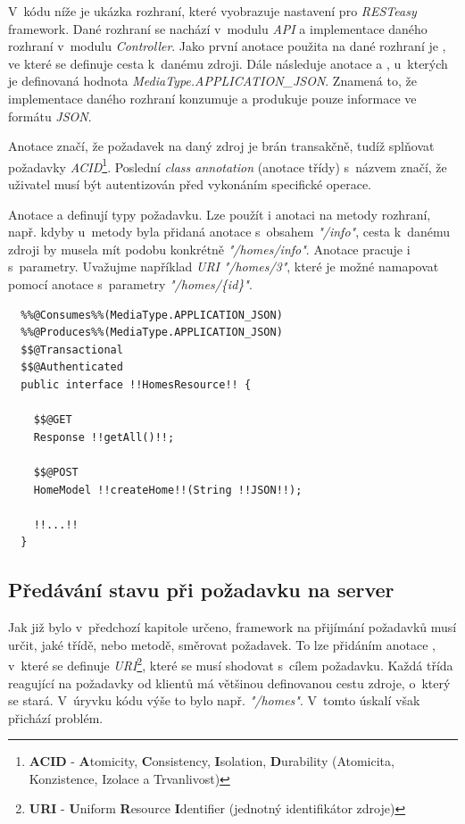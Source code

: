 V~kódu níže je ukázka rozhraní, které vyobrazuje nastavení pro \emph{RESTeasy} framework.
Dané rozhraní se nachází v~modulu \emph{API} a implementace daného rozhraní v~modulu \emph{Controller}.
Jako první anotace použita na dané rozhraní je , ve které se definuje cesta k~danému zdroji.
Dále následuje anotace  a , u~kterých je definovaná hodnota \emph{MediaType.APPLICATION\_JSON}.
Znamená to, že implementace daného rozhraní konzumuje a produkuje pouze informace ve formátu \emph{JSON}.

Anotace  značí, že požadavek na daný zdroj je brán transakčně, tudíž splňovat požadavky \emph{ACID}\footnote{\textbf{ACID} - \textbf{A}tomicity, \textbf{C}onsistency, \textbf{I}solation, \textbf{D}urability (Atomicita, Konzistence, Izolace a Trvanlivost)}.
Poslední \emph{class annotation} (anotace třídy) s~názvem  značí, že uživatel musí být autentizován před vykonáním specifické operace.

Anotace  a  definují typy požadavku.
Lze použít i anotaci  na metody rozhraní, např. kdyby u~metody byla přidaná anotace  s~obsahem \emph{"/info"}, cesta k~danému zdroji
by musela mít podobu konkrétně \emph{"/homes/info"}.
Anotace  pracuje i s~parametry.
Uvažujme například \emph{URI} \emph{"/homes/3"}, které je možné namapovat pomocí anotace  s~parametry \emph{"/homes/\{id\}"}.

\begin{lstlisting}[style=JavaStyle, caption={Ukázka deklarování rozhraní pro správu domácností}]
  %%@Path%%("/homes")
  %%@Consumes%%(MediaType.APPLICATION_JSON)
  %%@Produces%%(MediaType.APPLICATION_JSON)
  $$@Transactional
  $$@Authenticated
  public interface !!HomesResource!! {

    $$@GET
    Response !!getAll()!!;

    $$@POST
    HomeModel !!createHome!!(String !!JSON!!);

    !!...!!
  }
\end{lstlisting}

\newpage
\subsection*{Předávání stavu při požadavku na server}
\label{impl:backend:state}

Jak již bylo v~předchozí kapitole určeno, framework na přijímání požadavků musí určit, jaké třídě, nebo metodě, směrovat požadavek.
To lze přidáním anotace , v~které se definuje \emph{URI}\footnote{\textbf{URI} - \textbf{U}niform \textbf{R}esource \textbf{I}dentifier (jednotný identifikátor zdroje)}, které se musí shodovat s~cílem požadavku.
Každá třída reagující na požadavky od klientů má většinou definovanou cestu zdroje, o~který se stará.
V~úryvku kódu výše to bylo např. \emph{"/homes"}.
V~tomto úskalí však přichází problém.

